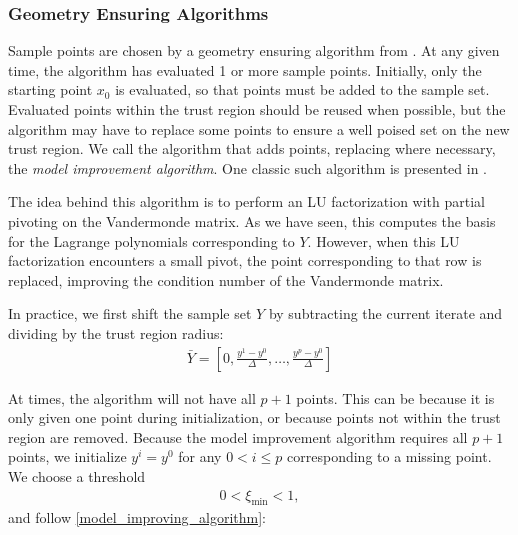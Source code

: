 \documentclass{article}
\theoremstyle{case}
\numberwithin{theorem}{subsection}
\newcommand{\ximin}{\xi_{\text{min}}}
\begin{document}
\subsubsection{Geometry Ensuring Algorithms}

Sample points are chosen by a geometry ensuring algorithm from \cite{introduction_book}.
At any given time, the algorithm has evaluated 1 or more sample points.
Initially, only the starting point $x_0$ is evaluated, so that points must be added to the sample set.
Evaluated points within the trust region should be reused when possible, but the algorithm may have to replace some points to ensure a well poised set on the new trust region.
We call the algorithm that adds points, replacing where necessary, the \emph{model improvement algorithm}.
One classic such algorithm is presented in \cite{introduction_book}.

The idea behind this algorithm is to perform an LU factorization with partial pivoting on the Vandermonde matrix.
As we have seen, this computes the basis for the Lagrange polynomials corresponding to $Y$.
However, when this LU factorization encounters a small pivot, the point corresponding to that row is replaced, improving the condition number of the Vandermonde matrix.

In practice, we first shift the sample set $Y$ by subtracting the current iterate and dividing by the trust region radius:
\begin{align}
\bar{Y} = [0, \frac{y^1 - y^0}{\Delta}, \ldots, \frac{y^p - y^0}{\Delta}]
\end{align}

At times, the algorithm will not have all $p+1$ points.
This can be because it is only given one point during initialization, or because points not within the trust region are removed.
Because the model improvement algorithm requires all $p+1$ points, we initialize $y^i = y^0$ for any $0 < i \le p$ corresponding to a missing point.
We choose a threshold 
\begin{align}
0 < \ximin < 1 \label{define_ximin},
\end{align} and follow \cref{model_improving_algorithm}:
\end{document}
